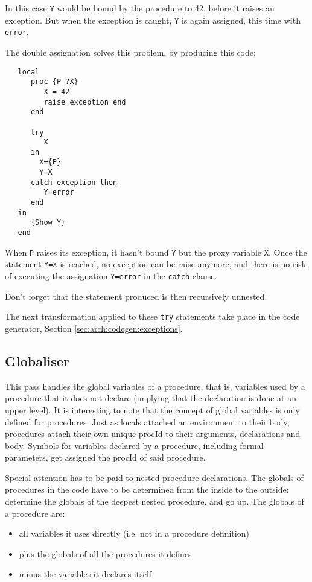 \documentclass[a4paper]{memoir}
\begin{document}
In this case \lstinline!Y! would be bound by
the procedure to 42, before it raises an exception. 
But when the exception is caught, \lstinline!Y! is again
assigned, this time with \lstinline!error!.

The double assignation solves this problem, by producing this code:
\begin{lstlisting}
   local
      proc {P ?X}
         X = 42
         raise exception end
      end
   
      try 
         X
      in 
        X={P}
        Y=X
      catch exception then
         Y=error
      end
   in
      {Show Y}
   end
\end{lstlisting}

When \lstinline!P! raises its exception, it hasn't bound \lstinline!Y! but the
proxy variable \lstinline!X!. Once the statement \lstinline!Y=X! is reached, no
exception can be raise anymore, and there is no risk of executing the
assignation \lstinline!Y=error! in the \lstinline!catch! clause.


Don't forget that the statement produced is then recursively unnested.

The next transformation applied to these \lstinline!try! statements take place
in the code generator, Section \ref{sec:arch:codegen:exceptions}.



\subsection{Globaliser}\label{sec:arch:globaliser}            
This pass handles the global variables of a procedure, that is, variables used by a procedure that it does not declare (implying that the declaration is done at an upper level). It is interesting to note that the concept of global variables is only defined for procedures.
Just as locals attached an environment to their body, procedures attach their own unique procId to their arguments, declarations and body.
Symbols for variables declared by a procedure, including formal parameters, get assigned the procId of said procedure.

Special attention has to be paid to nested procedure declarations.
The globals of procedures in the code have to be determined from the inside to the outside: determine the globals of the deepest nested procedure, and go up. 
The globals of a procedure are:
\begin{itemize}
  \item all variables it uses directly (i.e. not in a procedure definition)
  \item plus the globals of all the procedures it defines
  \item minus the variables it declares itself
\end{itemize}
\end{document}
